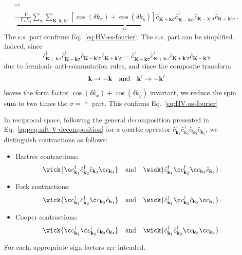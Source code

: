 \begin{tabproof}
\begin{multline*}
{		}^{\mathrm{s.s.}} \\
		\underbrace{
			- \frac{V}{L_x L_y} \sum_{\sigma}
			\sum_{\mathbf{K}, \mathbf{k}, \mathbf{k}'} \left[
			\cos \left(
			\delta k_x
			\right)	+ \cos \left(
			\delta k_y
			\right)	
			\right]	\hat c_{\mathbf{K}+\mathbf{k} \sigma}^\dagger \hat c_{\mathbf{K}-\mathbf{k}\overline{\sigma}}^\dagger \hat c_{\mathbf{K}-\mathbf{k}'\overline{\sigma}} \hat c_{\mathbf{K}+\mathbf{k}'\sigma}
		}_{\mathrm{o.s.}} \, .
	\end{multline*}
	The s.s. part confirms Eq.~\eqref{eq:HV-ss-fourier}. The o.s. part can be simplified. Indeed, since
	\[
		\hat c_{\mathbf{K}+\mathbf{k} \sigma}^\dagger \hat c_{\mathbf{K}-\mathbf{k}\overline{\sigma}}^\dagger \hat c_{\mathbf{K}-\mathbf{k}'\overline{\sigma}} \hat c_{\mathbf{K}+\mathbf{k}'\sigma} = \hat c_{\mathbf{K}-\mathbf{k}\overline{\sigma}}^\dagger \hat c_{\mathbf{K}+\mathbf{k} \sigma}^\dagger \hat c_{\mathbf{K}+\mathbf{k}'\sigma} \hat c_{\mathbf{K}-\mathbf{k}'\overline{\sigma}} 
	\]
	due to fermionic anti-commutation rules, and since the composite transform
	\[
		\mathbf{k} \to -\mathbf{k}
		\qq{and}
		\mathbf{k}' \to -\mathbf{k}'	
	\]
	leaves the form factor $\cos \left( \delta k_x \right)	+ \cos \left( \delta k_y \right)$ invariant, we reduce the spin sum to two times the $\sigma=\uparrow$ part. This confirms Eq.~\eqref{eq:HV-os-fourier}

\end{tabproof}

In reciprocal space, following the general decomposition presented in Eq.~\eqref{appeq:mft-V-decomposition} for a quartic operator $\hat c_{\mathbf{k}_1}^\dagger \hat c_{\mathbf{k}_2}^\dagger \hat c_{\mathbf{k}_3} \hat c_{\mathbf{k}_4}$, we distinguish contractions as follows:
\begin{itemize}
	\item Hartree contractions:
	\[
		\wick{
			\c c_{\mathbf{k}_1}^\dagger \hat c_{\mathbf{k}_2}^\dagger \hat c_{\mathbf{k}_3} \c c_{\mathbf{k}_4}
		}
		\qq{and}
		\wick{
			\hat c_{\mathbf{k}_1}^\dagger \c c_{\mathbf{k}_2}^\dagger \c c_{\mathbf{k}_3} \hat c_{\mathbf{k}_4}
		} \, .
	\]
	\item Fock contractions:
	\[
		\wick{
			\c c_{\mathbf{k}_1}^\dagger \hat c_{\mathbf{k}_2}^\dagger \c c_{\mathbf{k}_3} \hat c_{\mathbf{k}_4}
		}
		\qq{and}
		\wick{
			\hat c_{\mathbf{k}_1}^\dagger \c c_{\mathbf{k}_2}^\dagger \hat c_{\mathbf{k}_3} \c c_{\mathbf{k}_4}
		} \, .
	\]
	\item Cooper contractions:
	\[
		\wick{
			\c c_{\mathbf{k}_1}^\dagger \c c_{\mathbf{k}_2}^\dagger \hat c_{\mathbf{k}_3} \hat c_{\mathbf{k}_4}
		}
		\qq{and}
		\wick{
			\hat c_{\mathbf{k}_1}^\dagger \hat c_{\mathbf{k}_2}^\dagger \c c_{\mathbf{k}_3} \c c_{\mathbf{k}_4}
		} \, .
	\]
\end{itemize}
For each, appropriate sign factors are intended.

